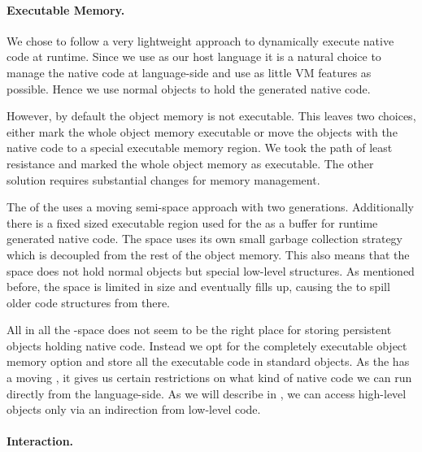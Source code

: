 \paragraph{Executable Memory.}
 
We chose to follow a very lightweight approach to dynamically execute native code at runtime. 
Since we use \PH as our host language it is a natural choice to manage the native code at language-side and use as little VM features as possible.
Hence we use normal \PH objects to hold the generated native code.

However, by default the object memory is not executable.
This leaves two choices, either mark the whole object memory executable or move the objects with the native code to a special executable memory region.
We took the path of least resistance and marked the whole object memory as executable.
The other solution requires substantial changes for memory management. 

The \GC of the \PH \VM uses a moving semi-space approach with two generations.
Additionally there is a fixed sized executable region used for the \JIT as a buffer for runtime generated native code.
The \JIT space uses its own small garbage collection strategy which is decoupled from the rest of the object memory.
This also means that the \JIT space does not hold normal \PH objects but special low-level structures.
As mentioned before, the \JIT space is limited in size and eventually fills up, causing the \JIT to spill older code structures from there. 

All in all the \JIT-space does not seem to be the right place for storing persistent \PH objects holding native code.
Instead we opt for the completely executable object memory option and store all the executable code in standard \PH objects.
As the \VM has a moving \GC, it gives us certain restrictions on what kind of native code we can run directly from the language-side. 
As we will describe in , we can access high-level \PH objects only via an indirection from low-level code.

\paragraph{\VM Interaction.}

